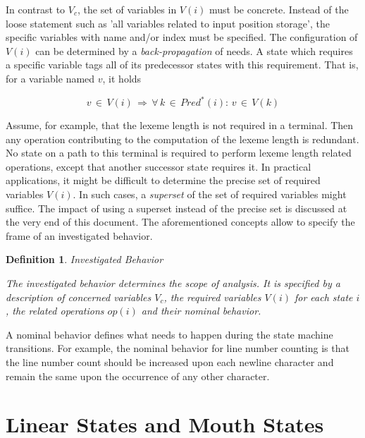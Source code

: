 \documentclass[12pt,a4paper]{scrartcl}
\newtheorem{definition}{Definition}
\begin{document}
In contrast to $V_c$, the set of variables in $V(i)$ must be concrete.  Instead
of the loose statement such as 'all variables related to input position
storage', the specific variables with name and/or index must be specified.  The
configuration of $V(i)$ can be determined by a \textit{back-propagation} of
needs. A state which requires a specific variable tags all of its predecessor
states with this requirement. That is, for a variable named $v$, it holds

\begin{equation}
    v\,\in\,V(i)\,\Rightarrow\,\forall\,k\,\in\,Pred^*(i):\,v\,\in\,V(k)
\end{equation}

Assume, for example, that the lexeme length is not required in a terminal. Then
any operation contributing to the computation of the lexeme length is
redundant.  No state on a path to this terminal is required to perform lexeme
length related operations, except that another successor state requires it.
In practical applications, it might be difficult to determine the precise
set of required variables $V(i)$. In such cases, a \textit{superset} of 
the set of required variables might suffice. The impact of using a superset
instead of the precise set is discussed at the very end of this document.
The aforementioned concepts allow to specify the frame of an investigated
behavior. 
\begin{definition}
Investigated Behavior 

The investigated behavior determines the scope of analysis. It is
specified by a description of concerned variables $V_c$, the required
variables $V(i)$ for each state $i$, the related operations $op(i)$ and
their nominal behavior.
\end{definition}
    
A nominal behavior defines what needs to happen during the state machine
transitions.  For example, the nominal behavior for line number counting is
that the line number count should be increased upon each newline character
and remain the same upon the occurrence of any other character. 

%
\section{Linear States and Mouth States}
\end{document}
